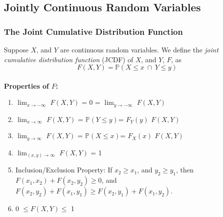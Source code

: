 \documentclass{article}
\newcommand{\ti}[1]{\textit{#1}}
\newcommand{\tb}[1]{\textbf{#1}}
\newcommand{\bbP}{\mathbb{P}}
\begin{document}
\subsection{Jointly Continuous Random Variables}
\subsubsection{The Joint Cumulative Distribution Function}
Suppose $X$, and $Y$ are continuous random variables. We define the \ti{joint cumulative distribution function} (JCDF) of $X$, and $Y$, $F$, as
\[F(X, Y) = \bbP(X\leq x\ \cap\ Y\leq y)\]\\
\tb{Properties of $F$:}
\begin{enumerate}
	\item $\lim_{x\to -\infty}$ $F(X, Y)$ = 0 = $\lim_{y\to -\infty}$ $F(X, Y)$
	\item $\lim_{x\to \infty}$ $F(X, Y)$ = $\bbP(Y\leq y)$= $F_{Y}(y)$ $F(X, Y)$
	\item $\lim_{y\to \infty}$ $F(X, Y)$ = $\bbP(X\leq x)$= $F_{X}(x)$ $F(X, Y)$
	\item $\lim_{(x, y)\to \infty}$ $F(X, Y)$ = 1
	\item Inclusion/Exclusion Property: If $x_{2} \geq x_{1}$, and $y_{2} \geq y_{1}$, then $F(x_1, x_2) + F(x_2, y_2) \geq 0$, and $F(x_2, y_2) + F(x_1, y_1) \geq F(x_2, y_1) + F(x_1, y_2)$.
	\item 0 $\leq F(X, Y) \leq$ 1
\end{enumerate}
\end{document}
